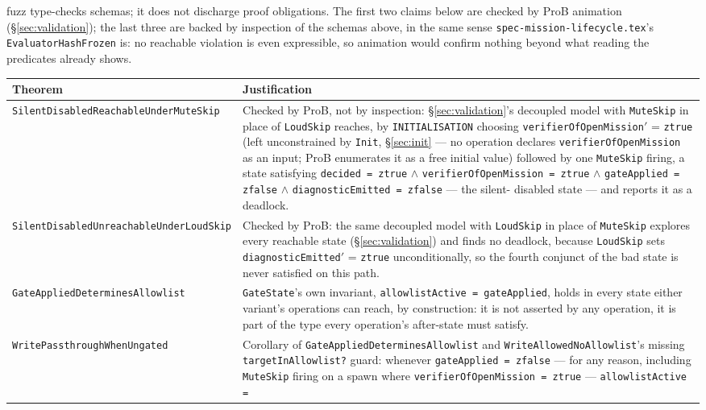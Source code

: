 \documentclass[a4paper,10pt,fleqn]{article}
\newcommand{\fpath}[1]{\texttt{#1}}
\newcommand{\field}[1]{\texttt{#1}}
\begin{document}
fuzz type-checks schemas; it does not discharge proof obligations.
The first two claims below are checked by ProB animation
(\S\ref{sec:validation}); the last three are backed by inspection of
the schemas above, in the same sense
\fpath{spec-mission-lifecycle.tex}'s \field{EvaluatorHashFrozen} is:
no reachable violation is even expressible, so animation would
confirm nothing beyond what reading the predicates already shows.

\begin{center}
\begin{tabularx}{\textwidth}{@{}lX@{}}
\toprule
\textbf{Theorem} & \textbf{Justification} \\
\midrule
\field{SilentDisabledReachableUnderMuteSkip} &
  Checked by ProB, not by inspection: \S\ref{sec:validation}'s
  decoupled model with \field{MuteSkip} in place of
  \field{LoudSkip} reaches, by \field{INITIALISATION} choosing
  \field{verifierOfOpenMission}$'$ = \field{ztrue} (left
  unconstrained by \field{Init}, \S\ref{sec:init} --- no operation
  declares \field{verifierOfOpenMission} as an input; ProB enumerates
  it as a free initial value) followed by one \field{MuteSkip}
  firing, a state satisfying \field{decided = ztrue} $\land$
  \field{verifierOfOpenMission = ztrue} $\land$ \field{gateApplied =
  zfalse} $\land$ \field{diagnosticEmitted = zfalse} --- the silent-
  disabled state --- and reports it as a deadlock. \\
\field{SilentDisabledUnreachableUnderLoudSkip} &
  Checked by ProB: the same decoupled model with \field{LoudSkip} in
  place of \field{MuteSkip} explores every reachable state
  (\S\ref{sec:validation}) and finds no deadlock, because
  \field{LoudSkip} sets \field{diagnosticEmitted}$'$ =
  \field{ztrue} unconditionally, so the fourth conjunct of the bad
  state is never satisfied on this path. \\
\field{GateAppliedDeterminesAllowlist} &
  \field{GateState}'s own invariant, \field{allowlistActive =
  gateApplied}, holds in every state either variant's operations can
  reach, by construction: it is not asserted by any operation, it is
  part of the type every operation's after-state must satisfy. \\
\field{WritePassthroughWhenUngated} &
  Corollary of \field{GateAppliedDeterminesAllowlist} and
  \field{WriteAllowedNoAllowlist}'s missing \field{targetInAllowlist?}
  guard: whenever \field{gateApplied = zfalse} --- for any reason,
  including \field{MuteSkip} firing on a spawn where
  \field{verifierOfOpenMission = ztrue} --- \field{allowlistActive =
}
\end{tabularx}
\end{center}
\end{document}
